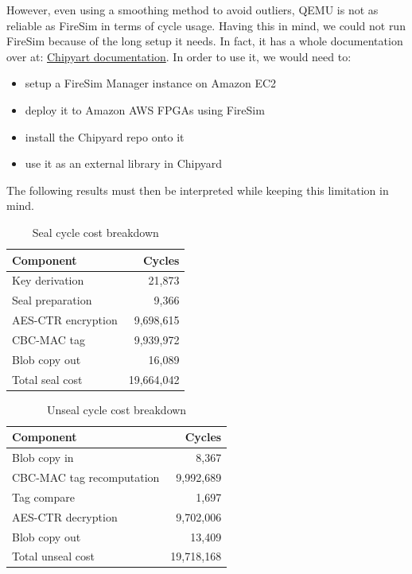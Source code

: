 \documentclass[11pt,a4paper]{report}
\begin{document}
However, even using a smoothing method to avoid outliers, QEMU is not as reliable as FireSim \cite{keystone-web} in terms of cycle usage.
Having this in mind, we could not run FireSim because of the long setup it needs.
In fact, it has a whole documentation over at: \href{https://chipyard.readthedocs.io/en/latest/simulation/fpga-accelerated-simulation/#firesim-sim-intro}{Chipyart documentation}.
In order to use it, we would need to:
\begin{itemize}
    \item setup a FireSim Manager instance on Amazon EC2
    \item deploy it to Amazon AWS FPGAs using FireSim
    \item install the Chipyard repo onto it
    \item use it as an external library in Chipyard
\end{itemize}
The following results must then be interpreted while keeping this limitation in mind.

\begin{table}[H]
    \centering
    \label{tab:seal_cycle_breakdown}
    \begin{tabular}{|l|r|}
        \hline
        Component & Cycles \\
        \hline
        Key derivation & 21,873 \\
        Seal preparation & 9,366 \\
        AES-CTR encryption & 9,698,615 \\
        CBC-MAC tag & 9,939,972 \\
        Blob copy out & 16,089 \\
        Total seal cost & 19,664,042 \\
        \hline
    \end{tabular}
    \caption{Seal cycle cost breakdown}

\end{table}

\begin{table}[H]
    \centering
    \label{tab:unseal_cycle_breakdown}
    \begin{tabular}{|l|r|}
        \hline
        Component & Cycles \\
        \hline
        Blob copy in & 8,367 \\
        CBC-MAC tag recomputation & 9,992,689 \\
        Tag compare & 1,697 \\
        AES-CTR decryption & 9,702,006 \\
        Blob copy out & 13,409 \\
        Total unseal cost & 19,718,168 \\
        \hline
    \end{tabular}
    \caption{Unseal cycle cost breakdown}

\end{table}
\end{document}
